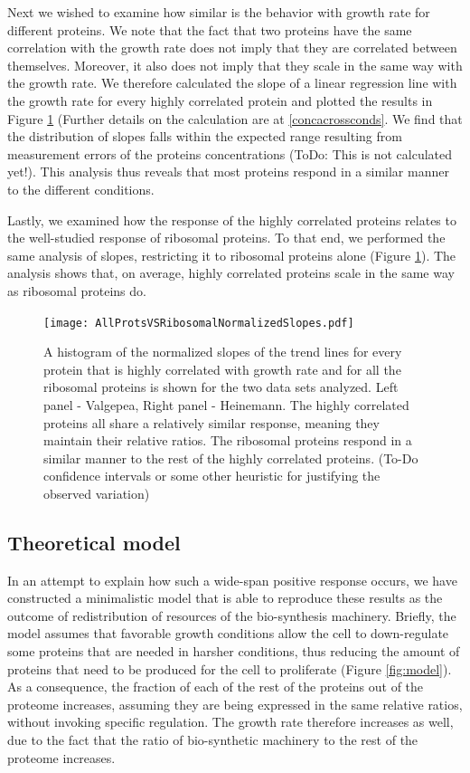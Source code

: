 \documentclass[notitlepage]{article}
\begin{document}
Next we wished to examine how similar is the behavior with growth rate for different proteins.
We note that the fact that two proteins have the same correlation with the growth rate does not imply that they are correlated between themselves.
Moreover, it also does not imply that they scale in the same way with the growth rate.
We therefore calculated the slope of a linear regression line with the growth rate for every highly correlated protein and plotted the results in Figure \ref{fig:globalfit} (Further details on the calculation are at \ref{concacrossconds}.
We find that the distribution of slopes falls within the expected range resulting from measurement errors of the proteins concentrations (ToDo: This is not calculated yet!).
This analysis thus reveals that most proteins respond in a similar manner to the different conditions.

Lastly, we examined how the response of the highly correlated proteins relates to the well-studied response of ribosomal proteins.
To that end, we performed the same analysis of slopes, restricting it to ribosomal proteins alone (Figure \ref{fig:globalfit}).
The analysis shows that, on average, highly correlated proteins scale in the same way as ribosomal proteins do.

\begin{figure}[h]
\centering
\texttt{[image: AllProtsVSRibosomalNormalizedSlopes.pdf]}
\caption{
    A histogram of the normalized slopes of the trend lines for every protein that is highly correlated with growth rate and for all the ribosomal proteins is shown for the two data sets analyzed.
    Left panel - Valgepea, Right panel - Heinemann.
    The highly correlated proteins all share a relatively similar response, meaning they maintain their relative ratios.
    The ribosomal proteins respond in a similar manner to the rest of the highly correlated proteins.
    (To-Do confidence intervals or some other heuristic for justifying the observed variation)
}
\label{fig:globalfit}
\end{figure}

\subsection{Theoretical model}
In an attempt to explain how such a wide-span positive response occurs, we have constructed a minimalistic model that is able to reproduce these results as the outcome of redistribution of resources of the bio-synthesis machinery.
Briefly, the model assumes that favorable growth conditions allow the cell to down-regulate some proteins that are needed in harsher conditions, thus reducing the amount of proteins that need to be produced for the cell to proliferate (Figure \ref{fig:model}).
As a consequence, the fraction of each of the rest of the proteins out of the proteome increases, assuming they are being expressed in the same relative ratios, without invoking specific regulation.
The growth rate therefore increases as well, due to the fact that the ratio of bio-synthetic machinery to the rest of the proteome increases.
\end{document}

